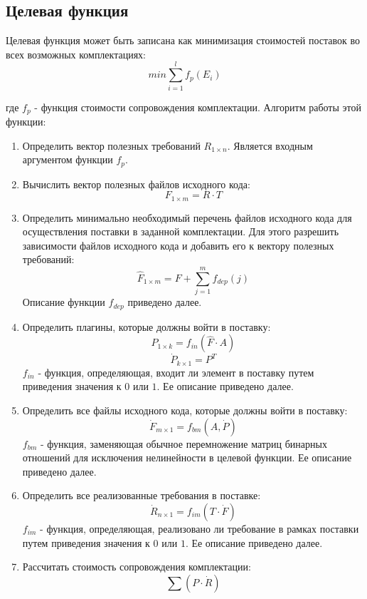 \subsection*{Целевая функция}
Целевая функция может быть записана как минимизация стоимостей поставок во всех возможных комплектациях:
\begin{equation}
    \displaystyle min \sum^{l}_{i = 1} f_{p}(E_{i})
\end{equation}

где $f_{p}$ - функция стоимости сопровождения комплектации. Алгоритм работы этой функции:

\begin{enumerate}
  \item Определить вектор полезных требований $R_{1 \times n}$. Является входным аргументом функции $f_{p}$.
  \item Вычислить вектор полезных файлов исходного кода:
  \begin{equation}
    F_{1 \times m} = R \cdot T
  \end{equation}
  \item Определить минимально необходимый перечень файлов исходного кода для осуществления поставки в заданной комплектации. Для этого разрешить зависимости файлов исходного кода и добавить его к вектору полезных требований: 
  \begin{equation}
    \hat{F}_{1 \times m} = F + \sum^{m}_{j = 1}f_{dep}(j)
  \end{equation}
  Описание функции $f_{dep}$ приведено далее.
  \item Определить плагины, которые должны войти в поставку:
  \begin{equation}
    P_{1 \times k} = f_{in}(\hat{F} \cdot A)
  \end{equation}
  \begin{equation}
    \dot{P}_{k \times 1} = P^{T}
  \end{equation}
  $f_{in}$ - функция, определяющая, входит ли элемент в поставку путем приведения значения к $0$ или $1$. Ее описание приведено далее.
  \item Определить все файлы исходного кода, которые должны войти в поставку:
  \begin{equation}
    \dot{F}_{m \times 1} = f_{bm}(A, \dot{P})
  \end{equation}
  $f_{bm}$ - функция, заменяющая обычное перемножение матриц бинарных отношений для исключения нелинейности в целевой функции. Ее описание приведено далее.
  \item Определить все реализованные требования в поставке:
  \begin{equation}
    \dot{R}_{n \times 1} = f_{im}(T \cdot \dot{F})
  \end{equation}
  $f_{im}$ - функция, определяющая, реализовано ли требование в рамках поставки путем приведения значения к $0$ или $1$. Ее описание приведено далее.
  \item Рассчитать стоимость сопровождения комплектации:
  \begin{equation}
    \sum (P \cdot \dot{R})
  \end{equation}
\end{enumerate}

